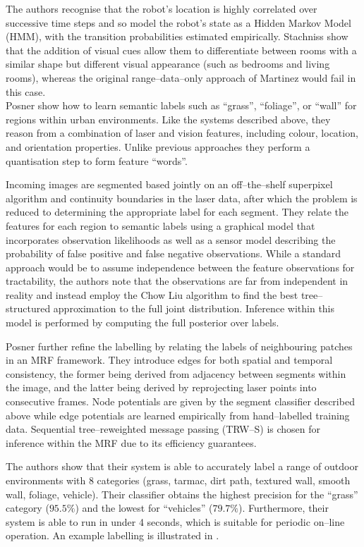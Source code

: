 The authors recognise that the robot's location is highly correlated
over successive time steps and so model the robot's state as a Hidden
Markov Model (HMM), with the transition probabilities estimated
empirically. Stachniss \etal show that the addition of visual cues
allow them to differentiate between rooms with a similar shape but
different visual appearance (such as bedrooms and living rooms),
whereas the original range--data--only approach of Martinez would fail
in this case.\\

Posner \etal \cite{Posner08} show how to learn semantic labels such as
``grass'', ``foliage'', or ``wall'' for regions within urban
environments. Like the systems described above, they reason from a
combination of laser and vision features, including colour, location,
and orientation properties. Unlike previous approaches they perform a
quantisation step to form feature ``words''.

Incoming images are segmented based jointly on an off--the--shelf
superpixel algorithm and continuity boundaries in the laser data,
after which the problem is reduced to determining the appropriate
label for each segment. They relate the features for each region to
semantic labels using a graphical model that incorporates observation
likelihoods as well as a sensor model describing the probability of
false positive and false negative observations. While a standard
approach would be to assume independence between the feature
observations for tractability, the authors note that the observations
are far from independent in reality and instead employ the Chow Liu
algorithm to find the best tree--structured approximation to the full
joint distribution. Inference within this model is performed by
computing the full posterior over labels.

Posner \etal further refine the labelling by relating the labels of
neighbouring patches in an MRF framework. They introduce edges for
both spatial and temporal consistency, the former being derived from
adjacency between segments within the image, and the latter being
derived by reprojecting laser points into consecutive frames. Node
potentials are given by the segment classifier described above
while edge potentials are learned empirically from hand--labelled
training data. Sequential tree--reweighted message passing (TRW--S) is
chosen for inference within the MRF due to its efficiency guarantees.

The authors show that their system is able to accurately label a range
of outdoor environments with 8 categories (grass, tarmac, dirt path,
textured wall, smooth wall, foliage, vehicle). Their classifier
obtains the highest precision for the ``grass'' category ($95.5\%$)
and the lowest for ``vehicles'' ($79.7\%$). Furthermore, their system
is able to run in under 4 seconds, which is suitable for periodic
on--line operation. An example labelling is illustrated in
.

